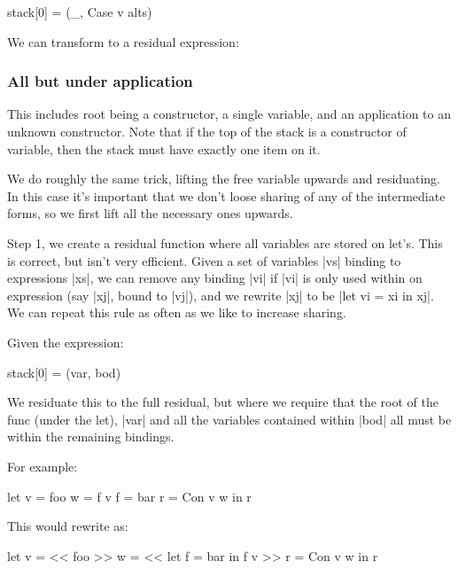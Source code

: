 \documentclass{sigplanconf}
\begin{document}
\begin{code}
stack[0] = (_, Case v alts)
\end{code}

We can transform to a residual expression:



\subsubsection{All but under application}

This includes root being a constructor, a single variable, and an application to an unknown constructor. Note that if the top of the stack is a constructor of variable, then the stack must have exactly one item on it.

We do roughly the same trick, lifting the free variable upwards and residuating. In this case it's important that we don't loose sharing of any of the intermediate forms, so we first lift all the necessary ones upwards.

Step 1, we create a residual function where all variables are stored on let's. This is correct, but isn't very efficient. Given a set of variables |vs| binding to expressions |xs|, we can remove any binding |vi| if |vi| is only used within on expression (say |xj|, bound to |vj|), and we rewrite |xj| to be |let vi = xi in xj|. We can repeat this rule as often as we like to increase sharing.

Given the expression:

\begin{code}
stack[0] = (var, bod)
\end{code}

We residuate this to the full residual, but where we require that the root of the func (under the let), |var| and all the variables contained within |bod| all must be within the remaining bindings.

For example:

\begin{code}
let v = foo
    w = f v
    f = bar
    r = Con v w
in r
\end{code}

This would rewrite as:

\begin{code}
let v = << foo >>
    w = << let f = bar in f v >>
    r = Con v w
in r
\end{code}
\end{document}
